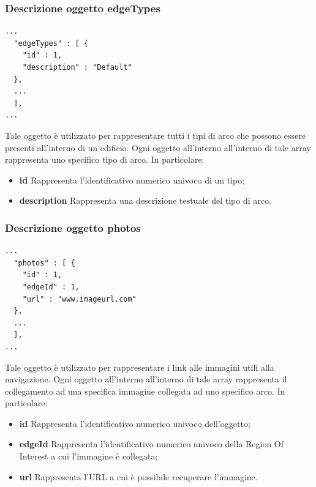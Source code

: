 \documentclass[../ManualeSviluppatore.tex]{subfiles}
\begin{document}
	\subsubsection{Descrizione oggetto edgeTypes}
		\begin{lstlisting}
...
  "edgeTypes" : [ {
    "id" : 1,
    "description" : "Default"
  }, 
  ...
  ],
...
		\end{lstlisting}
		Tale oggetto è utilizzato per rappresentare tutti i tipi di arco che possono essere presenti all'interno di un edificio. Ogni oggetto all'interno all'interno di tale array rappresenta uno specifico tipo di arco. In particolare:
		\begin{itemize}
			\item \textbf{id} Rappresenta l'identificativo numerico univoco di un tipo;
			\item \textbf{description} Rappresenta una descrizione testuale del tipo di arco.
		\end{itemize}
		
	\subsubsection{Descrizione oggetto photos}
		\begin{lstlisting}
...
  "photos" : [ {
    "id" : 1,
    "edgeId" : 1,
    "url" : "www.imageurl.com"
  },  
  ...
  ],
...
		\end{lstlisting}
		Tale oggetto è utilizzato per rappresentare i link alle immagini utili alla navigazione. Ogni oggetto all'interno all'interno di tale array rappresenta il collegamento ad una specifica immagine collegata ad uno specifico arco. In particolare:
		\begin{itemize}
			\item \textbf{id} Rappresenta l'identificativo numerico univoco dell'oggetto;
			\item \textbf{edgeId} Rappresenta l'identificativo numerico univoco della Region Of Interest a cui l'immagine è collegata;
			\item \textbf{url} Rappresenta l'URL a cui è possibile recuperare l'immagine.
		\end{itemize}
	
\end{document}
